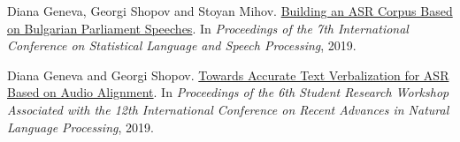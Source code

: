 \documentclass[12pt,a4paper,sans,colorlinks]{moderncv}
\begin{document}
\begin{cvenumerate}
	\item Diana Geneva, Georgi Shopov and Stoyan Mihov. \newline \href{https://link.springer.com/chapter/10.1007/978-3-030-31372-2_16}{Building an ASR Corpus Based on Bulgarian Parliament Speeches}. \newline In \emph{Proceedings of the 7th International Conference on Statistical Language and Speech Processing}, 2019.
	\item Diana Geneva and Georgi Shopov. \newline \href{https://aclanthology.org/R19-2007}{Towards Accurate Text Verbalization for ASR Based on Audio Alignment}. \newline In \emph{Proceedings of the 6th Student Research Workshop Associated with the 12th International Conference on Recent Advances in Natural Language Processing}, 2019.
\end{cvenumerate}
\end{document}
